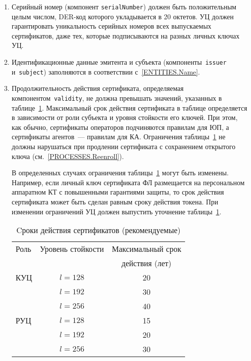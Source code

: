 \begin{enumerate}
\item
Серийный номер (компонент \texttt{serialNumber}) 
должен быть положительным целым 
числом, DER-код которого укладывается в 20 октетов.
%
УЦ должен гарантировать уникальность серийных 
номеров всех выпускаемых сертификатов, даже тех, которые 
подписываются на разных личных ключах УЦ.

\item
Идентификационные данные эмитента и субъекта (компоненты~\texttt{issuer} 
и~\texttt{subject}) заполняются в соответствии с~\ref{ENTITIES.Name}.

\item
Продолжительность действия сертификата, определяемая 
компонентом~\texttt{validity}, не должна превышать значений,
указанных в таблице~\ref{Table.CERT.Validity}.
%
Максимальный срок действия сертификата в таблице определяется в 
зависимости от роли субъекта и уровня стойкости его ключей.  
%
При этом, как обычно, сертификаты операторов подчиняются правилам для ЮП, 
а сертификаты агентов~--- правилам для КА.
%
Ограничения таблицы~\ref{Table.CERT.Validity} не должны нарушаться  
при продлении сертификата с сохранением открытого ключа 
(см.~\ref{PROCESSES.Reenroll}).

В определенных случаях ограничения таблицы~\ref{Table.CERT.Validity}
могут быть изменены. Например, если личный ключ сертификата ФЛ размещается на 
персональном аппаратном КТ с повышенными гарантиями защиты, то срок действия 
сертификата может быть сделан равным сроку действия токена. При изменении 
ограничений УЦ должен выпустить уточнение таблицы~\ref{Table.CERT.Validity}. 

\begin{table}[bht]
\caption{Cроки действия сертификатов (рекомендуемые)}
\label{Table.CERT.Validity}
\begin{tabular}{|l|c|c|}
\hline
Роль  & Уровень стойкости & Максимальный срок\\
      &                   & действия (лет)\\
\hline
\hline

КУЦ & $l=128$ & 20\\
\cline{2-3} & $l=192$ & 30\\
\cline{2-3} & $l=256$ & 40\\
\hline

РУЦ & $l=128$ & 15\\
\cline{2-3} & $l=192$ & 20\\
\cline{2-3} & $l=256$ & 30\\
\hline


\end{tabular}
\end{table}
\end{enumerate}
